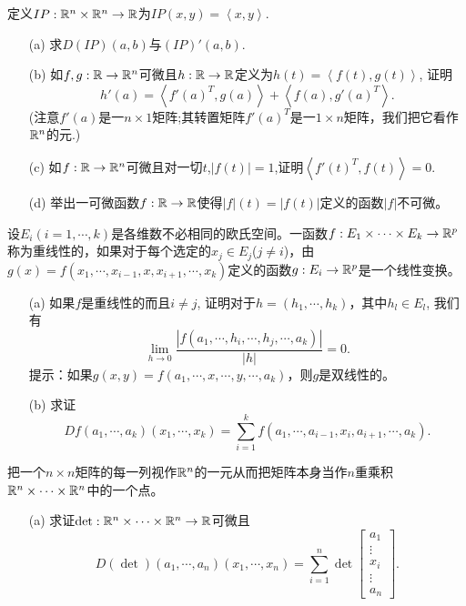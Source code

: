 \begin{problemset}
\item 定义$IP: \mathbb{R}^n \times \mathbb{R}^n \to \mathbb{R}$为$IP(x, y) = \left<x,y\right>$.
\begin{enumerate}
\item[(a)] 求$D(IP)(a, b)$与$(IP)'(a, b)$.
\item[(b)] 如$f, g: \mathbb{R} \to \mathbb{R}^n$可微且$h:\mathbb{R} \to \mathbb{R}$定义为$h(t) = \left<f(t), g(t)\right>$, 证明
\[
h'(a) = \left<f'(a)^{T}, g(a)\right> + \left<f(a), g'(a)^{T}\right>.
\]
(注意$f'(a)$是一$n \times 1$矩阵;其转置矩阵$f'(a)^{T}$是一$1 \times n$矩阵，我们把它看作$\mathbb{R}^n$的元.)
\item[(c)] 如$f:\mathbb{R} \to \mathbb{R}^n$可微且对一切$t$,$|f(t)| = 1$,证明$\left<f'(t)^{T}, f(t)\right> = 0$.
\item[(d)]举出一可微函数$f: \mathbb{R} \to \mathbb{R}$使得$|f|(t) = |f(t)|$定义的函数$|f|$不可微。
\end{enumerate}

\item 设$E_i(i=1,\cdots, k)$是各维数不必相同的欧氏空间。一函数$f: E_1 \times \cdots \times E_k \to \mathbb{R}^p$称为重线性的，如果对于每个选定的$x_j \in E_j$($j \neq i$)，由$g(x) = f(x_1,\cdots,x_{i-1}, x, x_{i+1},\cdots, x_k)$定义的函数$g:E_i \to \mathbb{R}^p$是一个线性变换。
\begin{enumerate}
\item[(a)]如果$f$是重线性的而且$i \neq j$, 证明对于$h = (h_1,\cdots, h_k)$，其中$h_l \in E_l$, 我们有
\[
\lim_{h \to 0}{\frac{|f(a_1,\cdots,h_i,\cdots,h_j,\cdots,a_k)|}{|h|}} = 0.
\]
提示：如果$g(x, y) = f(a_1,\cdots,x,\cdots,y,\cdots, a_k)$，则$g$是双线性的。
\item[(b)] 求证
\[
Df(a_1,\cdots, a_k)(x_1,\cdots, x_k) = \sum_{i=1}^{k}{f(a_1,\cdots, a_{i-1}, x_i, a_{i+1},\cdots, a_k)}.
\]
\end{enumerate}

\item 把一个$n \times n$矩阵的每一列视作$\mathbb{R}^n$的一元从而把矩阵本身当作$n$重乘积$\mathbb{R}^n \times \cdots \times \mathbb{R}^n$中的一个点。
\begin{enumerate}
\item[(a)] 求证$\det: \mathbb{R}^n \times \cdots \times \mathbb{R}^n \to \mathbb{R}$可微且
\[
D(\det)(a_1,\cdots, a_n)(x_1,\cdots, x_n) = \sum_{i=1}^{n}{\det\begin{bmatrix}a_1\\ \vdots \\x_i\\ \vdots\\ a_n\end{bmatrix}}.
\]


\end{enumerate}
\end{problemset}

